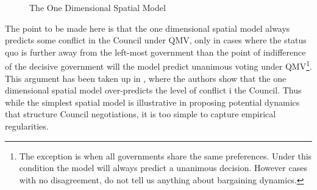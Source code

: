 \begin{figure}[h]
  \centering
  \caption{The One Dimensional Spatial Model}
  \label{fig:matillalane}
\end{figure}

The point to be made here is that the one dimensional spatial model always predicts some conflict in the Council under QMV, only in cases where the status quo is further away from the left-most government than the point of indifference of the decisive government will the model predict unanimous voting under QMV\footnote{The exception is when all governments share the same preferences. Under this condition the model will always predict a unanimous decision. However cases with no disagreement, do not tell us anything about bargaining dynamics.}. This argument has been taken up in \citet{MattilaLane2001}, where the authors show that the one dimensional spatial model over-predicts the level of conflict i the Council. Thus while the simplest spatial model is illustrative in proposing potential dynamics that structure Council negotiations, it is too simple to capture empirical regularities. 

